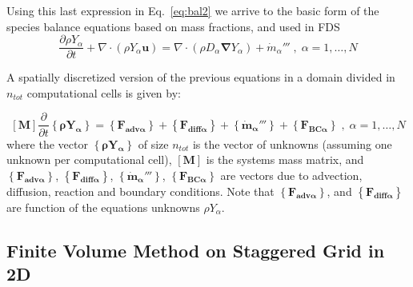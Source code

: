 Using this last expression in Eq.~\eqref{eq:bal2} we arrive to the basic form of the species balance equations based on mass fractions, and used in FDS
%
\begin{equation}
   \frac{\partial \rho Y_\alpha}{ \partial t} + \nabla \cdot ( \rho Y_\alpha  \mathbf{u} ) = \nabla \cdot ( \rho D_\alpha \boldsymbol{\nabla} Y_\alpha ) + \dot{m}_\alpha''' \; , \; \alpha=1,\dots,N \label{eq:bal3}
\end{equation}
%

A spatially discretized version of the previous equations in a domain divided in $n_{tot}$ computational cells is given by:

%
\begin{equation}
\left[ \mathbf{M} \right] \frac{\partial}{\partial t} \left\{ \mathbf{\rho Y_\alpha} \right\}  = \left\{ \mathbf{F_{adv \alpha}} \right\} + \left\{ \mathbf{F_{diff \alpha}} \right\} + \left\{  \mathbf{\dot{m}_\alpha'''} \right\} +  \left\{ \mathbf{F_{BC \alpha}} \right\} \; , \; \alpha=1,\dots,N \label{eq:discbal3}
\end{equation}
%
where the vector $\left\{ \mathbf{\rho Y_\alpha} \right\}$ of size $n_{tot}$ is the vector of unknowns (assuming one unknown per computational cell), $\left[ \mathbf{M} \right]$ is the systems mass matrix, and $\left\{ \mathbf{F_{adv \alpha}} \right\}$, $\left\{ \mathbf{F_{diff \alpha}} \right\}$, $\left\{  \mathbf{\dot{m}_\alpha'''} \right\}$, $\left\{ \mathbf{F_{BC \alpha}} \right\}$ are vectors due to advection, diffusion, reaction and boundary conditions. Note that  $\left\{ \mathbf{F_{adv \alpha}} \right\}$, and $\left\{ \mathbf{F_{diff \alpha}} \right\}$ are function of the equations unknowns $\rho Y_\alpha$. 

\subsection{Finite Volume Method on Staggered Grid in 2D}

